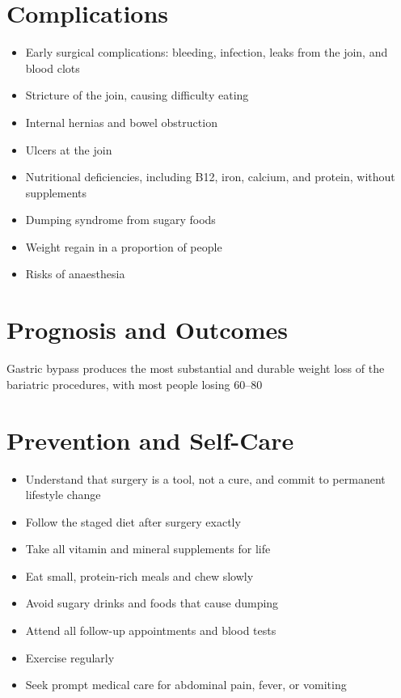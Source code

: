 \section*{Complications}
\begin{itemize}
    \item Early surgical complications: bleeding, infection, leaks from the join, and blood clots
    \item Stricture of the join, causing difficulty eating
    \item Internal hernias and bowel obstruction
    \item Ulcers at the join
    \item Nutritional deficiencies, including B12, iron, calcium, and protein, without supplements
    \item Dumping syndrome from sugary foods
    \item Weight regain in a proportion of people
    \item Risks of anaesthesia
\end{itemize}

\section*{Prognosis and Outcomes}
Gastric bypass produces the most substantial and durable weight loss of the bariatric procedures, with most people losing 60--80%

\section*{Prevention and Self-Care}
\begin{itemize}
    \item Understand that surgery is a tool, not a cure, and commit to permanent lifestyle change
    \item Follow the staged diet after surgery exactly
    \item Take all vitamin and mineral supplements for life
    \item Eat small, protein-rich meals and chew slowly
    \item Avoid sugary drinks and foods that cause dumping
    \item Attend all follow-up appointments and blood tests
    \item Exercise regularly
    \item Seek prompt medical care for abdominal pain, fever, or vomiting
\end{itemize}

